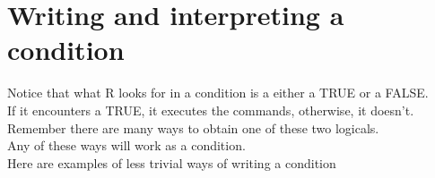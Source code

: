 \documentclass[]{book}
\newenvironment{Shaded}{}{}
\newcommand{\CommentTok}[1]{\textcolor[rgb]{0.38,0.63,0.69}{\textit{#1}}}
\newcommand{\DecValTok}[1]{\textcolor[rgb]{0.25,0.63,0.44}{#1}}
\newcommand{\NormalTok}[1]{#1}
\newcommand{\OperatorTok}[1]{\textcolor[rgb]{0.40,0.40,0.40}{#1}}
\newcommand{\OtherTok}[1]{\textcolor[rgb]{0.00,0.44,0.13}{#1}}
\newcommand{\StringTok}[1]{\textcolor[rgb]{0.25,0.44,0.63}{#1}}
\theoremstyle{definition}
\theoremstyle{definition}
\theoremstyle{definition}
\theoremstyle{remark}
\begin{document}
\begin{Shaded}
\end{Shaded}

\hypertarget{writing-and-interpreting-a-condition}{%
\section{Writing and interpreting a
condition}\label{writing-and-interpreting-a-condition}}

Notice that what R looks for in a condition is a either a TRUE or a
FALSE.\\
If it encounters a TRUE, it executes the commands, otherwise, it
doesn't.\\
Remember there are many ways to obtain one of these two logicals.\\
Any of these ways will work as a condition.\\
Here are examples of less trivial ways of writing a condition
\end{document}
